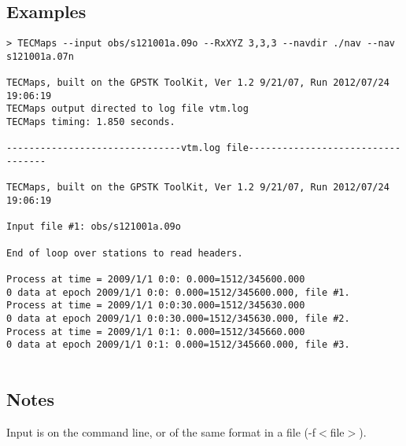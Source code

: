 \subsection{Examples}
\begin{verbatim}
> TECMaps --input obs/s121001a.09o --RxXYZ 3,3,3 --navdir ./nav --nav s121001a.07n

TECMaps, built on the GPSTK ToolKit, Ver 1.2 9/21/07, Run 2012/07/24 19:06:19
TECMaps output directed to log file vtm.log
TECMaps timing: 1.850 seconds.

-------------------------------vtm.log file----------------------------------

TECMaps, built on the GPSTK ToolKit, Ver 1.2 9/21/07, Run 2012/07/24 19:06:19

Input file #1: obs/s121001a.09o

End of loop over stations to read headers.

Process at time = 2009/1/1 0:0: 0.000=1512/345600.000
0 data at epoch 2009/1/1 0:0: 0.000=1512/345600.000, file #1.
Process at time = 2009/1/1 0:0:30.000=1512/345630.000
0 data at epoch 2009/1/1 0:0:30.000=1512/345630.000, file #2.
Process at time = 2009/1/1 0:1: 0.000=1512/345660.000
0 data at epoch 2009/1/1 0:1: 0.000=1512/345660.000, file #3.


\end{verbatim}


\subsection{Notes}
Input is on the command line, or of the same format in a file (-f$<$file$>$).

%

